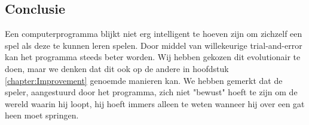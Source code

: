 \subsection{Conclusie}
Een computerprogramma blijkt niet erg intelligent te hoeven zijn om zichzelf een spel als deze te kunnen leren spelen. Door middel van willekeurige trial-and-error kan het programma steeds beter worden. Wij hebben gekozen dit evolutionair te doen, maar we denken dat dit ook op de andere in hoofdstuk \ref{chapter:Improvement} genoemde manieren kan. We hebben gemerkt dat de speler, aangestuurd door het programma, zich niet "bewust" hoeft te zijn om de wereld waarin hij loopt, hij hoeft immers alleen te weten wanneer hij over een gat heen moet springen.